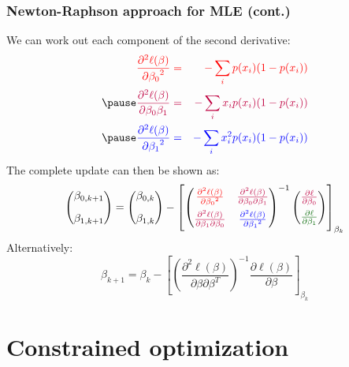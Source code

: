 \documentclass[smaller]{beamer}
\newcommand{\lt}{\left}
\newcommand{\rt}{\right}
\newcommand{\?}{\stackrel{?}{=}}
\newcommand{\rd}{\color{red}}
\newcommand{\bl}{\color{blue}}
\newcommand{\pl}{\color{purple}}
\newcommand{\gr}{\color{green!40!black}}
\newcommand{\pd}[2]{\frac{\partial{#1}}{\partial{#2}}}
\newcommand{\pdd}[2]{\frac{\partial^2{#1}}{\partial{#2}^2}}
\newcommand{\pde}[3]{\frac{\partial^2{#1}}{\partial{#2}\partial{#3}}}
\begin{document}
\begin{frame}
  \frametitle{Newton-Raphson approach for MLE (cont.)}\pause
  We can work out each component of the second derivative: \pause
  \begin{eqnarray}
    \label{eq:20}
    \rd \pdd{\ell(\beta)}{\beta_0} & \rd =& \rd - \sum_i p(x_i)(1 - p(x_i)) \\\pause
    \pl \pd{^2\ell(\beta)}{\beta_0\beta_1} & \pl =& \pl  - \sum_i x_i p(x_i)(1 - p(x_i)) \\\pause
    \bl \pdd{\ell(\beta)}{\beta_1} & \bl =& \bl  - \sum_ix_i^2 p(x_i)(1 - p(x_i)) 
  \end{eqnarray}
  \pause
  The complete update can then be shown as:\pause
  \begin{equation}
    \label{eq:22}
    \begin{pmatrix}
      \beta_{0,k+1}\\[3mm]
      \beta_{1,k+1}    
    \end{pmatrix}
     = 
    \begin{pmatrix}
      \beta_{0,k}\\[3mm]
      \beta_{1,k}
    \end{pmatrix}  -
    \lt[
    \begin{pmatrix}
      \rd \pdd{\ell(\beta)}{\beta_0} & \pl \pde{\ell(\beta)}{\beta_0}{\beta_1} \\[2mm]
      \pl \pde{\ell(\beta)}{\beta_1}{\beta_0} &  \bl \pdd{\ell(\beta)}{\beta_1}
    \end{pmatrix}^{-1}
    \begin{pmatrix}
      \pl \pd{\ell}{\beta_0}\\[2mm]
      \gr \pd{\ell}{\beta_1}
    \end{pmatrix}\rt]_{\beta_k}
  \end{equation}\pause
  Alternatively:\pause
  \begin{equation}
    \label{eq:28}
    \beta_{k+1}  = \beta_k - \lt[\lt(\pde{\ell(\beta)}{\beta}{\beta^T}\rt)^{-1} \pd{\ell(\beta)}{\beta}\rt]_{\beta_k}
  \end{equation}
\end{frame}

\section{Constrained optimization}
\end{document}
